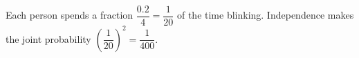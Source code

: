 Each person spends a fraction $\dfrac{0.2}{4}=\dfrac{1}{20}$ of the time blinking. Independence makes the joint probability $\left(\dfrac{1}{20}\right)^2=\boxed{\dfrac{1}{400}}$.
